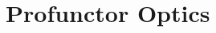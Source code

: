\documentclass[11pt,a4paper]{article}
\makeatletter
\theoremstyle{plain}
\theoremstyle{definition}
\newcommand{\id}{\mathrm{id}}
\providecommand{\leftsquigarrow}{%
  \mathrel{\mathpalette\reflect@squig\relax}%
}
\newcommand{\reflect@squig}[2]{%
  \reflectbox{$\m@th#1\rightsquigarrow$}%
}
\newcommand{\todo}[1]{\textcolor{red}{\small #1}}
\makeatother
\begin{document}
%
%

\section{Profunctor Optics}
\end{document}

